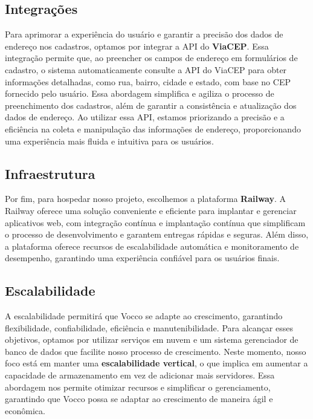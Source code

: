 \subsection{Integrações}
Para aprimorar a experiência do usuário e garantir a precisão dos dados de endereço nos cadastros, optamos por integrar a API do \textbf{ViaCEP}. Essa integração permite que, ao preencher os campos de endereço em formulários de cadastro, o sistema automaticamente consulte a API do ViaCEP para obter informações detalhadas, como rua, bairro, cidade e estado, com base no CEP fornecido pelo usuário. Essa abordagem simplifica e agiliza o processo de preenchimento dos cadastros, além de garantir a consistência e atualização dos dados de endereço. Ao utilizar essa API, estamos priorizando a precisão e a eficiência na coleta e manipulação das informações de endereço, proporcionando uma experiência mais fluida e intuitiva para os usuários.
\subsection{Infraestrutura}
Por fim, para hospedar nosso projeto, escolhemos a plataforma \textbf{Railway}. A Railway oferece uma solução conveniente e eficiente para implantar e gerenciar aplicativos web, com integração contínua e implantação contínua que simplificam o processo de desenvolvimento e garantem entregas rápidas e seguras. Além disso, a plataforma oferece recursos de escalabilidade automática e monitoramento de desempenho, garantindo uma experiência confiável para os usuários finais.
\subsection{Escalabilidade}
A escalabilidade permitirá que Vocco se adapte ao crescimento, garantindo flexibilidade, confiabilidade, eficiência e manutenibilidade. Para alcançar esses objetivos, optamos por utilizar serviços em nuvem e um sistema gerenciador de banco de dados que facilite nosso processo de crescimento. Neste momento, nosso foco está em manter uma \textbf{escalabilidade vertical}, o que implica em aumentar a capacidade de armazenamento em vez de adicionar mais servidores. Essa abordagem nos permite otimizar recursos e simplificar o gerenciamento, garantindo que Vocco possa se adaptar ao crescimento de maneira ágil e econômica.
